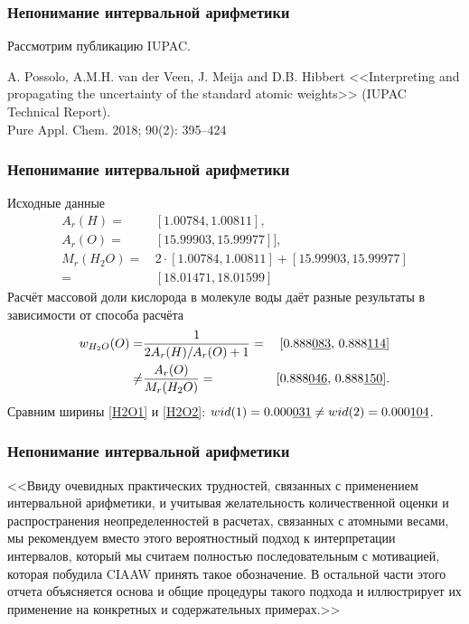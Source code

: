 \begin{frame}
	\frametitle{Непонимание интервальной арифметики}

Рассмотрим публикацию IUPAC.

\medskip	
A. Possolo, A.M.H. van der Veen, J. Meija and D.B. Hibbert
<<Interpreting and propagating the uncertainty of the standard atomic weights>> (IUPAC Technical Report). \\
Pure Appl. Chem. 2018; 90(2): 395–424 %




\end{frame}

\begin{frame}
	\frametitle{Непонимание интервальной арифметики}
Исходные данные
	\begin{align*}
A_r(H) = & \, [1.007 84, 1.008 11],\\
A_r(O) = & \,[15.999 03, 15.999 77]], \\
M_r(H_2O) = & \, 2 \cdot[1.007 84, 1.00811] + [15.99903,15.999 77] \\
 = & \,[18.01471, 18.015 99]
\end{align*}
Расчёт массовой доли кислорода в молекуле воды даёт разные результаты в зависимости от способа расчёта
\begin{align}
		w_{H_2O}(O) = & \frac{1}{2A_r(H)/A_r(O)+1} = &[0.888 \underline{083}, \, 0.888 \underline{114}] \label{H2O1} \\
		\ne & \frac{A_r(O)}{M_r(H_2O)} =& [0.888 \underline{046}, \, 0.888\underline{150}]. \label{H2O2}
\end{align}
Сравним ширины \eqref{H2O1}	и \eqref{H2O2}:
$wid (1) = 0.000\underline{031} \ne wid (2) = 0.000\underline{104} $.
	
\end{frame}


\begin{frame}
	\frametitle{Непонимание интервальной арифметики}


	
<<Ввиду очевидных практических трудностей, связанных с применением интервальной арифметики, и учитывая
желательность количественной оценки и распространения неопределенностей в расчетах, связанных с атомными весами, мы рекомендуем
вместо этого вероятностный подход к интерпретации интервалов, который мы считаем полностью последовательным
с мотивацией, которая побудила CIAAW принять такое обозначение. 
\medskip
В остальной части этого отчета объясняется основа и
общие процедуры такого подхода и иллюстрирует их применение на конкретных и содержательных примерах.>>
	
\end{frame}


